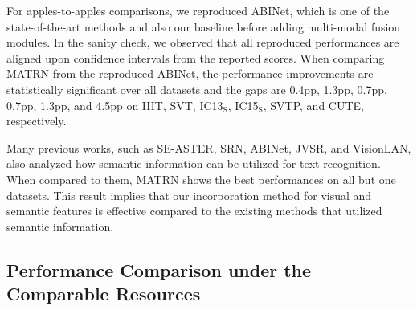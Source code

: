 \documentclass[runningheads]{llncs}
\begin{document}
For apples-to-apples comparisons, we reproduced ABINet, which is one of the state-of-the-art methods and also our baseline before adding multi-modal fusion modules. In the sanity check, we observed that all reproduced performances are aligned upon confidence intervals from the reported scores. When comparing MATRN from the reproduced ABINet, the performance improvements are statistically significant over all datasets and the gaps are 0.4pp, 1.3pp, 0.7pp, 0.7pp, 1.3pp, and 4.5pp on IIIT, SVT, IC13$_\text{S}$, IC15$_\text{S}$, SVTP, and CUTE, respectively.

Many previous works, such as SE-ASTER, SRN, ABINet, JVSR, and VisionLAN, also analyzed how semantic information can be utilized for text recognition. When compared to them, MATRN shows the best performances on all but one datasets. This result implies that our incorporation method for visual and semantic features is effective compared to the existing methods that utilized semantic information.


\subsection{Performance Comparison under the Comparable Resources}
\end{document}

